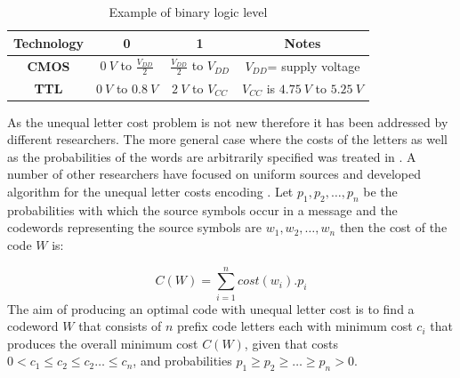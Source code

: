 \documentclass[preprint,12pt]{elsarticle}
\begin{document}
\begin{table}[thpb]
\renewcommand{\arraystretch}{1.5}
\caption{Example of binary logic level}
\label{table1}
\centering
\begin{tabular}{c c c c}
\hline
 \bfseries Technology  & 0 & 1&Notes\\
\hline
\bfseries CMOS & $0~V$ to $\frac{V_{DD}}{2}$&$\frac{V_{DD}}{2}$ to $V_{DD}$&$V_{DD}$= supply voltage\\
\bfseries TTL & $0~V$ to $0.8~V$&$2~V$ to $V_{CC}$ &$V_{CC}$ is $4.75~V$ to $5.25~V$\\
\hline
\end{tabular}
\end{table}

As the unequal letter cost problem is not new therefore it has been addressed by different researchers. The more general case where the costs of the letters as well as the probabilities of the words are arbitrarily specified was treated in \cite{Karp61}. A number of other researchers have focused on uniform sources and developed algorithm for the unequal letter costs encoding \cite{Gil95, Kar62,Varn71,AltMel80,perl1975}.  Let $p_1,p_2,\ldots,p_n$ be the probabilities with which the source symbols occur in a message and the codewords representing the source symbols are $w_1,w_2,\ldots,w_n$ then the cost of the code $W$ is:

\begin{equation}
C\left(W\right)=\sum_{i=1}^{n}cost\left(w_i\right).p_i 
\end{equation}
The aim of producing an optimal code with unequal letter cost is to find a codeword $W$ that consists of $n$ prefix code letters each with minimum cost $c_i$ that produces the overall minimum cost $C\left(W\right)$, given that costs $0<c_1\leq c_2 \leq c_2 \ldots \leq c_n$, and probabilities $p_1\geq p_2\geq \ldots\geq p_n>0$.
\end{document}
